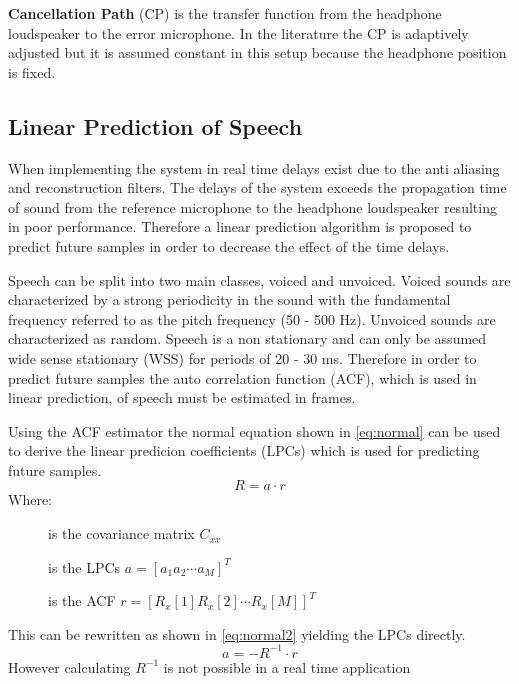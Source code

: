 \textbf{Cancellation Path} (CP) is the transfer function from the headphone loudspeaker to the error microphone. In the literature \cite{Hansen} the CP is adaptively adjusted but it is assumed constant in this setup because the headphone position is fixed.     

\subsection*{Linear Prediction of Speech}
When implementing the system in real time delays exist due to the anti aliasing and reconstruction filters. The delays of the system exceeds the propagation time of sound from the reference microphone to the headphone loudspeaker resulting in poor performance. Therefore a linear prediction algorithm is proposed to predict future samples in order to decrease the effect of the time delays.


Speech can be split into two main classes, voiced and unvoiced. Voiced sounds are characterized by a strong periodicity in the sound with the fundamental frequency referred to as the pitch frequency (50 - 500 Hz). Unvoiced sounds are characterized as random. Speech is a non stationary and can only be assumed wide sense stationary (WSS) for periods of 20 - 30 ms. Therefore in order to predict future samples the auto correlation function (ACF), which is used in linear prediction, of speech must be estimated in frames. 


Using the ACF estimator the normal equation shown in \autoref{eq:normal} can be used to derive the linear predicion coefficients (LPCs) which is used for predicting future samples. 
\begin{equation}\label{eq:normal}
R = a\cdot r
\end{equation}
Where:
\vspace{-8mm} %
\begin{description}
	\item[] is the covariance matrix $C_{xx}$
	\item[] is the LPCs $a = [a_1 a_2 \cdots a_M]^T$
	\item[] is the ACF $r = [R_x[1] R_x[2] \cdots R_x[M]]^T$
\end{description}
This can be rewritten as shown in \autoref{eq:normal2} yielding the LPCs directly.  
 \begin{equation}\label{eq:normal2}
a = -R^{-1}\cdot r
\end{equation}
However calculating $R^{-1}$ is not possible in a real time application 




